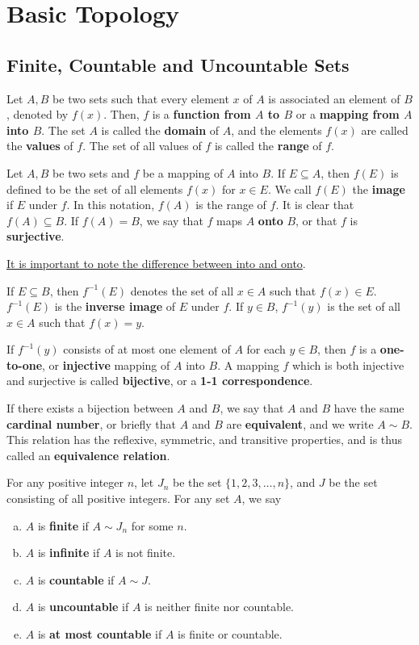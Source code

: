 \chapter{Basic Topology}

\section{Finite, Countable and Uncountable Sets}

\begin{definition}
Let $A, B$ be two sets such that every element $x$ of $A$ is associated an element of $B$, denoted by $f(x)$. Then, $f$ is a \textbf{function from $A$ to $B$} or a \textbf{mapping from $A$ into $B$}. The set $A$ is called the \textbf{domain} of $A$, and the elements $f(x)$ are called the \textbf{values} of $f$. The set of all values of $f$ is called the \textbf{range} of $f$.

Let $A, B$ be two sets and $f$ be a mapping of $A$ into $B$. If $E \subseteq A$, then $f(E)$ is defined to be the set of all elements $f(x)$ for $x \in E$. We call $f(E)$ the \textbf{image} if $E$ under $f$. In this notation, $f(A)$ is the range of $f$. It is clear that $f(A) \subseteq B$. If $f(A) = B$, we say that $f$ maps $A$ \textbf{onto} $B$, or that $f$ is \textbf{surjective}. 

\underline{It is important to note the difference between into and onto}.

If $E \subseteq B$, then $f^{-1}(E)$ denotes the set of all $x \in A$ such that $f(x) \in E$. $f^{-1}(E)$ is the \textbf{inverse image} of $E$ under $f$. If $y \in B$, $f^{-1}(y)$ is the set of all $x \in A$ such that $f(x) = y$.

If $f^{-1}(y)$ consists of at most one element of $A$ for each $y \in B$, then $f$ is a \textbf{one-to-one}, or \textbf{injective} mapping of $A$ into $B$. A mapping $f$ which is both injective and surjective is called \textbf{bijective}, or a  \textbf{1-1 correspondence}. 

If there exists a bijection between $A$ and $B$, we say that $A$ and $B$ have the same \textbf{cardinal number}, or briefly that $A$ and $B$ are \textbf{equivalent}, and we write $A \sim B$. This relation has the reflexive, symmetric, and transitive properties, and is thus called an \textbf{equivalence relation}.

For any positive integer $n$, let $J_n$ be the set $\{1, 2, 3, \dotsc, n\}$, and $J$ be the set consisting of all positive integers. For any set $A$, we say
\begin{enumerate}[(a)]
\item $A$ is \textbf{finite} if $A \sim J_n$ for some $n$.
\item $A$ is \textbf{infinite} if $A$ is not finite.
\item $A$ is \textbf{countable} if $A \sim J$.
\item $A$ is \textbf{uncountable} if $A$ is neither finite nor countable.
\item $A$ is \textbf{at most countable} if $A$ is finite or countable.
\end{enumerate}


\end{definition}
